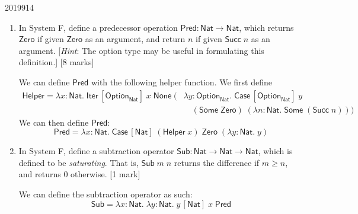 \documentclass[10pt,\jkfside,a4paper]{article}
\newcommand{\answer}[1]{
    \begin{tcolorbox}[colframe=black, colback=white, sharp corners, boxrule=0.2mm, breakable]
        #1
    \end{tcolorbox}
}
\newcommand{\qmarks}[1]{\hspace*{\fill}[#1]}
\begin{document}
\begin{examquestion}{2019}{9}{14}
\begin{enumerate}
\begin{enumerate}
            \end{enumerate}

        \item
            In System F, define a predecessor operation
            $\mathsf{Pred} : \mathsf{Nat} \to \mathsf{Nat}$, which returns
            $\mathsf{Zero}$ if given $\mathsf{Zero}$ as an argument, and return $n$ if
            given $\mathsf{Succ}\;n$ as an argument. [\textit{Hint}: The option type may
            be useful in formulating this definition.] \qmarks{8 marks}

            \answer{
                We can define $\mathsf{Pred}$ with the following helper function. We first define
                \begin{align*}
                    \mathsf{Helper} = \lambda x{:}\mathsf{Nat}.\; \mathsf{Iter}\,[\mathsf{Option}_{\mathsf{Nat}}]\;x\;\mathsf{None}\;
                    (&\lambda y{:}\mathsf{Option}_{\mathsf{Nat}}.\; \mathsf{Case}\,[\mathsf{Option}_{\mathsf{Nat}}]\;y \\
                     &\quad (\mathsf{Some}\;\mathsf{Zero})\;(\lambda n{:}\mathsf{Nat}.\; \mathsf{Some}\;(\mathsf{Succ}\;n)))
                \end{align*}
                We can then define $\mathsf{Pred}$:
                \[
                    \mathsf{Pred} = \lambda x{:}\mathsf{Nat}.\; \mathsf{Case}\,[\mathsf{Nat}]\;(\mathsf{Helper}\;x)\;\mathsf{Zero}\;(\lambda y{:}\mathsf{Nat}.\; y)
                \]
            }

        \item
            In System F, define a subtraction operator
            $\mathsf{Sub} : \mathsf{Nat} \to \mathsf{Nat} \to \mathsf{Nat}$, which is
            defined to be \emph{saturating}. That is, $\mathsf{Sub}\;m\;n$ returns the
            difference if $m \geq n$, and returns 0 otherwise. \qmarks{1 mark}

            \answer{
                We can define the subtraction operator as such:
                \[
                    \mathsf{Sub} = \lambda x{:}\mathsf{Nat}.\; \lambda y{:}\mathsf{Nat}.\; y\,[\mathsf{Nat}]\;x\;\mathsf{Pred}
                \]
            }

    \end{enumerate}

\end{examquestion}
\end{document}

